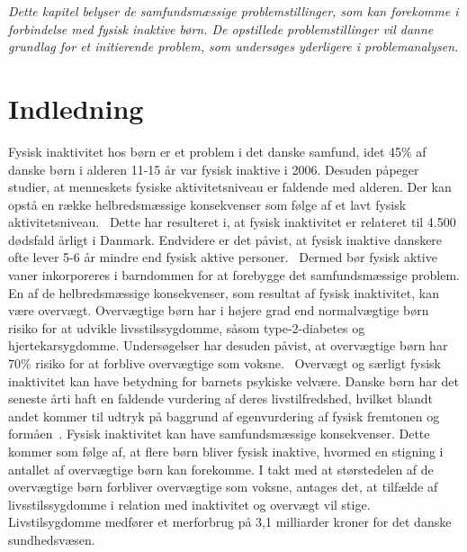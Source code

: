 \textit{Dette kapitel belyser de samfundsmæssige problemstillinger, som kan forekomme i forbindelse med fysisk inaktive børn. De opstillede problemstillinger vil danne grundlag for et initierende problem, som undersøges yderligere i problemanalysen.}

\section{Indledning}
Fysisk inaktivitet hos børn er et problem i det danske samfund, idet 45\% af danske børn i alderen 11-15 år var fysisk inaktive i 2006. Desuden påpeger studier, at menneskets fysiske aktivitetsniveau er faldende med alderen. Der kan opstå en række helbredsmæssige konsekvenser som følge af et lavt fysisk aktivitetsniveau.~\citep{Sundhedsstyrelsen2006} Dette har resulteret i, at fysisk inaktivitet er relateret til 4.500 dødsfald årligt i Danmark. Endvidere er det påvist, at fysisk inaktive danskere ofte lever 5-6 år mindre end fysisk aktive personer.~\citep{JuelSoerensenBroennum-Hansen2006} Dermed bør fysisk aktive vaner inkorporeres i barndommen for at forebygge det samfundsmæssige problem.\\ %
En af de helbredsmæssige konsekvenser, som resultat af fysisk inaktivitet, kan være overvægt. Overvægtige børn har i højere grad end normalvægtige børn risiko for at udvikle livsstilssygdomme, såsom type-2-diabetes og hjertekarsygdomme. Undersøgelser har desuden påvist, at overvægtige børn har 70\% risiko for at forblive overvægtige som voksne.~\citep{Reilly2006} Overvægt og særligt fysisk inaktivitet kan have betydning for barnets psykiske velvære. Danske børn har det seneste årti haft en faldende vurdering af deres livstilfredshed, hvilket blandt andet kommer til udtryk på baggrund af egenvurdering af fysisk fremtonen og formåen~\citep{Universitet2014,StatensInstitutforFolkesundhed2007}. \newline
Fysisk inaktivitet kan have samfundsmæssige konsekvenser. Dette kommer som følge af, at flere børn bliver fysisk inaktive, hvormed en stigning i antallet af overvægtige børn kan forekomme. I takt med at størstedelen af de overvægtige børn forbliver overvægtige som voksne, antages det, at tilfælde af livsstilssygdomme i relation med inaktivitet og overvægt vil stige. Livstilsygdomme medfører et merforbrug på 3,1 milliarder kroner for det danske sundhedsvæsen.~\citep{JuelSoerensenBroennum-Hansen2006}

